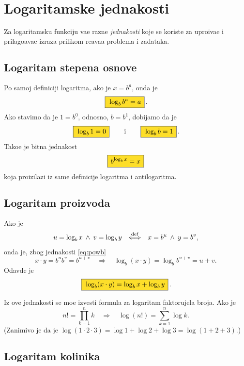 \documentclass[12pt, twoside, a4paper]{article}
\def\land{\mathbin{\>\wedge\>}}
\def\logb{\log_b}
\def\okvir#1{\,\fcolorbox{black}{Goldenrod}{$\,\displaystyle{\mathstrut #1}\,$}\,}
\def\sledi{{\quad\Rightarrow\quad}}
\def\podef{{\quad\buildrel\rm def\over\Longleftrightarrow\quad}}
\begin{document}


\tableofcontents



\section{Logaritamske jednakosti}

Za logaritamsku funkciju va{\zv}e razne {\sl jednakosti\/} koje se koriste za 
upro{\sv}{\cc}iva{\nj}e i pri\-la\-go\-{\dj}a\-va\-{\nj}e izraza prilikom re{\sv}ava{\nj}a
problema i zadataka.

\subsection{Logaritam stepena osnove}

Po samoj definiciji logaritma, ako je $x=b^a$, onda je
\begin{equation}
\okvir{\logb b^a=a}.
\label{eq:powb}
\end{equation}
Ako stavimo da je $1=b^0$, odnosno, $b=b^1$, dobijamo da je
\begin{equation}
\okvir{\logb 1=0}\qquad\text{i}\qquad\okvir{\logb b=1}.
\end{equation}
Tako{\dj}e je bitna jednakost
\begin{equation}
\okvir{b^{\logb x}=x}
\end{equation}
koja proizilazi iz same definicije logaritma i antilogaritma.

\subsection{Logaritam proizvoda}

Ako je
$$
u=\logb x\land v=\log_b y \podef x=b^u\land y=b^v,
$$
onda je, zbog jednakosti \eqref{eq:powb}
$$
x\cdot y=b^ub^v=b^{u+v}\sledi \logb(x\cdot y)=\logb b^{u+v}=u+v.
$$
Odavde je
\begin{equation}
\okvir{\logb(x\cdot y)=\logb x+\logb y}.
\label{eq:lnmul}
\end{equation}

Iz ove jednakosti se mo{\zv}e izvesti formula za logaritam faktorujela broja. Ako je
$$
n!=\prod_{k=1}^n k\sledi \log(n!)=\sum_{k=1}^n\log k.
$$
(Zanim{\lj}ivo je da je $\log(1\cdot2\cdot3)=\log1+\log2+\log3=\log(1+2+3)$.)


\subsection{Logaritam koli{\cv}nika}
\end{document}
